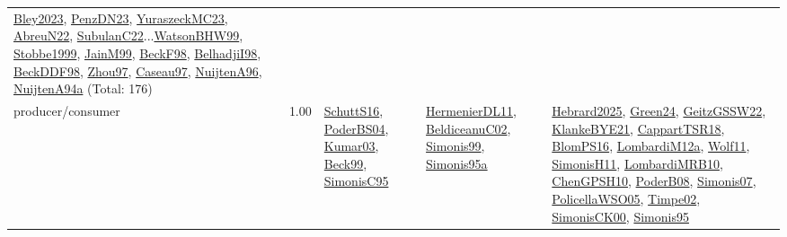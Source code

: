 {\begin{longtable}{p{3cm}r>{\raggedright\arraybackslash}p{6cm}>{\raggedright\arraybackslash}p{6cm}>{\raggedright\arraybackslash}p{8cm}}
\hyperref[detail:Bley2023]{Bley2023}, \hyperref[detail:PenzDN23]{PenzDN23}, \hyperref[detail:YuraszeckMC23]{YuraszeckMC23}, \hyperref[detail:AbreuN22]{AbreuN22}, \hyperref[detail:SubulanC22]{SubulanC22}...\hyperref[detail:WatsonBHW99]{WatsonBHW99}, \hyperref[detail:Stobbe1999]{Stobbe1999}, \hyperref[detail:JainM99]{JainM99}, \hyperref[detail:BeckF98]{BeckF98}, \hyperref[detail:BelhadjiI98]{BelhadjiI98}, \hyperref[detail:BeckDDF98]{BeckDDF98}, \hyperref[detail:Zhou97]{Zhou97}, \hyperref[detail:Caseau97]{Caseau97}, \hyperref[detail:NuijtenA96]{NuijtenA96}, \hyperref[detail:NuijtenA94a]{NuijtenA94a} (Total: 176)\\
\index{producer/consumer}\index{Concepts!producer/consumer}producer/consumer &  1.00 & \hyperref[detail:SchuttS16]{SchuttS16}, \hyperref[detail:PoderBS04]{PoderBS04}, \hyperref[detail:Kumar03]{Kumar03}, \hyperref[detail:Beck99]{Beck99}, \hyperref[detail:SimonisC95]{SimonisC95} & \hyperref[detail:HermenierDL11]{HermenierDL11}, \hyperref[detail:BeldiceanuC02]{BeldiceanuC02}, \hyperref[detail:Simonis99]{Simonis99}, \hyperref[detail:Simonis95a]{Simonis95a} & \hyperref[detail:Hebrard2025]{Hebrard2025}, \hyperref[detail:Green24]{Green24}, \hyperref[detail:GeitzGSSW22]{GeitzGSSW22}, \hyperref[detail:KlankeBYE21]{KlankeBYE21}, \hyperref[detail:CappartTSR18]{CappartTSR18}, \hyperref[detail:BlomPS16]{BlomPS16}, \hyperref[detail:LombardiM12a]{LombardiM12a}, \hyperref[detail:Wolf11]{Wolf11}, \hyperref[detail:SimonisH11]{SimonisH11}, \hyperref[detail:LombardiMRB10]{LombardiMRB10}, \hyperref[detail:ChenGPSH10]{ChenGPSH10}, \hyperref[detail:PoderB08]{PoderB08}, \hyperref[detail:Simonis07]{Simonis07}, \hyperref[detail:PolicellaWSO05]{PolicellaWSO05}, \hyperref[detail:Timpe02]{Timpe02}, \hyperref[detail:SimonisCK00]{SimonisCK00}, \hyperref[detail:Simonis95]{Simonis95}\\

\end{longtable}}
